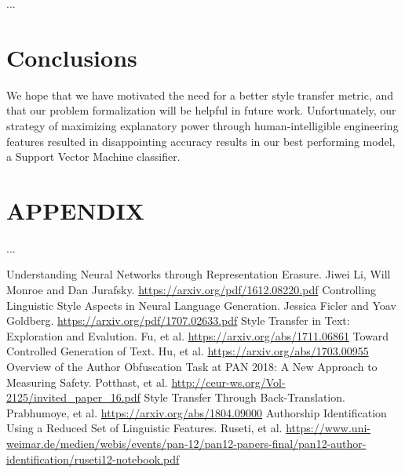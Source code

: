\documentclass[letterpaper, 10 pt, conference]{ieeeconf}  %
\begin{document}
...
\section{Conclusions}
We hope that we have motivated the need for a better style transfer metric, and that our problem formalization will be helpful in future work. Unfortunately, our strategy of maximizing explanatory power through human-intelligible engineering features resulted in disappointing accuracy results in our best performing model, a Support Vector Machine classifier.



\addtolength{\textheight}{-12cm}   %







\section*{APPENDIX}

...


\begin{thebibliography}{99}

 Understanding Neural Networks through Representation Erasure. Jiwei Li, Will Monroe and Dan Jurafsky. \url{https://arxiv.org/pdf/1612.08220.pdf}
 Controlling Linguistic Style Aspects in Neural Language Generation. Jessica Ficler and Yoav Goldberg. \url{https://arxiv.org/pdf/1707.02633.pdf}
 Style Transfer in Text: Exploration and Evalution. Fu, et al. \url{https://arxiv.org/abs/1711.06861}
 Toward Controlled Generation of Text. Hu, et al. \url{https://arxiv.org/abs/1703.00955}
 Overview of the Author Obfuscation Task at PAN 2018: A New Approach to Measuring Safety. Potthast, et al. \url{http://ceur-ws.org/Vol-2125/invited_paper_16.pdf}
 Style Transfer Through Back-Translation. Prabhumoye, et al. \url{https://arxiv.org/abs/1804.09000}
 Authorship Identification Using a Reduced Set of Linguistic Features. Ruseti, et al. \url{https://www.uni-weimar.de/medien/webis/events/pan-12/pan12-papers-final/pan12-author-identification/ruseti12-notebook.pdf}


\end{thebibliography}
\end{document}
